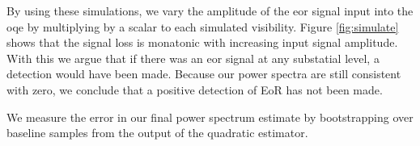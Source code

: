 \documentclass[twocolumn,numberedappendix]{emulateapj} \shorttitle{PSA64}
\begin{document}
By using these simulations, we vary the amplitude of the eor signal input into
the oqe by multiplying by a scalar to each simulated visibility. Figure
\ref{fig:simulate} shows that the signal loss is monatonic with increasing
input signal amplitude. With this we argue that if there was an eor signal at
any substatial level, a detection would have been made. Because our power
spectra are still consistent with zero, we conclude that a positive detection of
EoR has not been made. 




%

We measure the error in our final power spectrum estimate by bootstrapping over
baseline samples from the output of the quadratic estimator.
%
%
%
%
%
%
%
\end{document}
